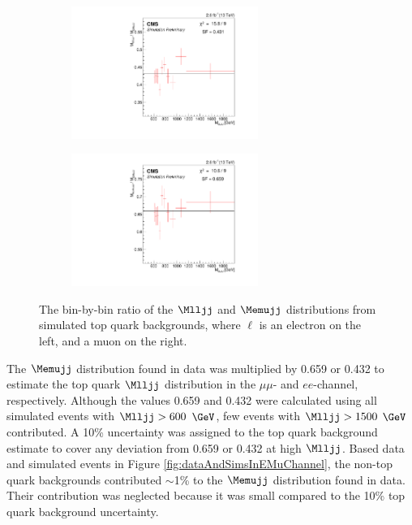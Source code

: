 \begin{figure}
	\centering
	\begin{subfigure}[t]{2.4in}
		\centering
		\includegraphics[width=2.4in]{figures/flavor_ratio_EE_variablebinwidth.pdf}
	\end{subfigure}
	\thickspace
	\begin{subfigure}[t]{2.4in}
		\centering
		\includegraphics[width=2.4in]{figures/flavor_ratio_MuMu_variablebinwidth.pdf}
	\end{subfigure}
	\caption{The bin-by-bin ratio of the $\Mlljj$ and $\Memujj$ distributions from simulated top quark backgrounds, where 
		$\ell$ is an electron on the left, and a muon on the right.}
	\label{fig:ttbarSFratios}
\end{figure}

The $\Memujj$ distribution found in data was multiplied by 0.659 or 0.432 to estimate the top quark $\Mlljj$ distribution in the 
$\mu\mu$- and $ee$-channel, respectively.  Although the values 0.659 and 0.432 were calculated using all simulated events with 
$\Mlljj > 600$ $\GeV$, few events with $\Mlljj > 1500$ $\GeV$ contributed.  A 10\% uncertainty was assigned to the top quark background 
estimate to cover any deviation from 0.659 or 0.432 at high $\Mlljj$.  Based data and simulated events in Figure 
\ref{fig:dataAndSimsInEMuChannel}, the non-top quark backgrounds contributed $\sim$1\% to the $\Memujj$ distribution found in data.  
Their contribution was neglected because it was small compared to the 10\% top quark background uncertainty.


